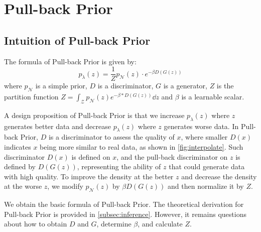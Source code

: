 
\section{Pull-back Prior}\label{sec:pull_back_prior}

\subsection{Intuition of Pull-back Prior}\label{subsec:intuition}

The formula of Pull-back Prior is given by:
\begin{equation}\label{eq:pull_back_prior}
	p_\lambda(z) = \frac{1}{Z} p_\mathcal{N}(z) \cdot e^{- \beta D(G(z))} \tag{4}
\end{equation}
where $p_\mathcal{N}$ is a simple prior, $D$ is a discriminator, $G$ is a generator, $Z$ is the partition function $Z = \int_{\mathcal{Z}} p_\mathcal{N}(z) e^{- \beta * D(G(z))} \dd z$ and $\beta$ is a learnable scalar.

A design proposition of Pull-back Prior is that we increase $p_\lambda(z)$ where $z$ generates better data and decrease $p_\lambda(z)$ where $z$ generates worse data. In Pull-back Prior, 
$D$ is a discriminator to assess the quality of $x$, where smaller $D(x)$ indicates $x$ being more similar to real data, as shown in \cref{fig:interpolate}. Such discriminator $D(x)$ is defined on $x$, and the pull-back discriminator on $z$ is defined by $D(G(z))$, representing the ability of $z$ that could generate data with high quality. To improve the density at the better $z$ and decrease the density at the worse $z$, we modify $p_\mathcal{N}(z)$ by $\beta D(G(z))$ and then normalize it by $Z$. 

We obtain the basic formula of Pull-back Prior. The theoretical derivation for Pull-back Prior is provided in \cref{subsec:inference}. However, it remains questions about how to obtain $D$ and $G$, determine $\beta$, and calculate $Z$. 

